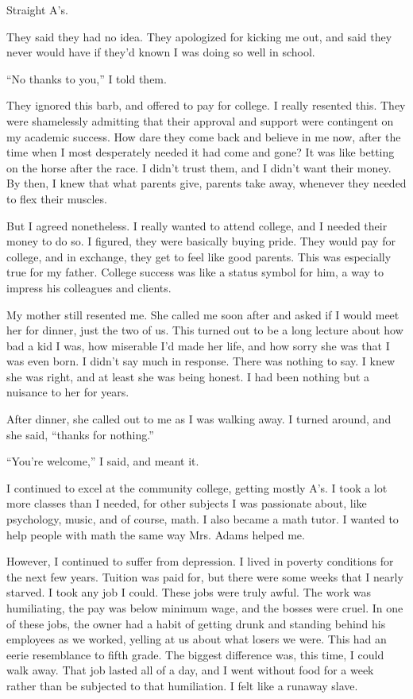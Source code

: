 Straight A's.

They said they had no idea. They apologized for kicking me out, and said they never would have if they'd known I was doing so well in school.

``No thanks to you,'' I told them.

They ignored this barb, and offered to pay for college. I really resented this. They were shamelessly admitting that their approval and support were contingent on my academic success. How dare they come back and believe in me now, after the time when I most desperately needed it had come and gone? It was like betting on the horse after the race. I didn't trust them, and I didn't want their money. By then, I knew that what parents give, parents take away, whenever they needed to flex their muscles.

But I agreed nonetheless. I really wanted to attend college, and I needed their money to do so. I figured, they were basically buying pride. They would pay for college, and in exchange, they get to feel like good parents. This was especially true for my father. College success was like a status symbol for him, a way to impress his colleagues and clients.

My mother still resented me. She called me soon after and asked if I would meet her for dinner, just the two of us. This turned out to be a long lecture about how bad a kid I was, how miserable I'd made her life, and how sorry she was that I was even born. I didn't say much in response. There was nothing to say. I knew she was right, and at least she was being honest. I had been nothing but a nuisance to her for years.

After dinner, she called out to me as I was walking away. I turned around, and she said, ``thanks for nothing.''

``You're welcome,'' I said, and meant it.

I continued to excel at the community college, getting mostly A's. I took a lot more classes than I needed, for other subjects I was passionate about, like psychology, music, and of course, math. I also became a math tutor. I wanted to help people with math the same way Mrs. Adams helped me.

However, I continued to suffer from depression. I lived in poverty conditions for the next few years. Tuition was paid for, but there were some weeks that I nearly starved. I took any job I could. These jobs were truly awful. The work was humiliating, the pay was below minimum wage, and the bosses were cruel. In one of these jobs, the owner had a habit of getting drunk and standing behind his employees as we worked, yelling at us about what losers we were. This had an eerie resemblance to fifth grade. The biggest difference was, this time, I could walk away. That job lasted all of a day, and I went without food for a week rather than be subjected to that humiliation. I felt like a runaway slave.

